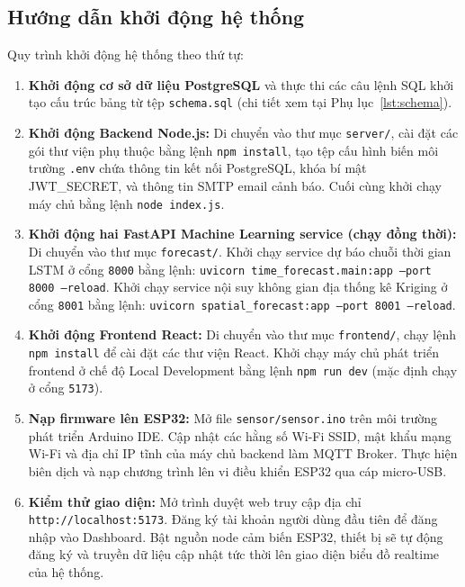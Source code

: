 \subsection{Hướng dẫn khởi động hệ thống}
\label{subsec:design:deploy:guide}

Quy trình khởi động hệ thống theo thứ tự:

\begin{enumerate}[leftmargin=2cm]
  \item \textbf{Khởi động cơ sở dữ liệu PostgreSQL} và thực thi các câu lệnh SQL khởi tạo cấu trúc bảng từ tệp \texttt{schema.sql} (chi tiết xem tại Phụ lục~\ref{lst:schema}).
  \item \textbf{Khởi động Backend Node.js:}
    Di chuyển vào thư mục \texttt{server/}, cài đặt các gói thư viện phụ thuộc bằng lệnh \texttt{npm install}, tạo tệp cấu hình biến môi trường \texttt{.env} chứa thông tin kết nối PostgreSQL, khóa bí mật JWT\_SECRET, và thông tin SMTP email cảnh báo. Cuối cùng khởi chạy máy chủ bằng lệnh \texttt{node index.js}.
  \item \textbf{Khởi động hai FastAPI Machine Learning service (chạy đồng thời):}
    Di chuyển vào thư mục \texttt{forecast/}. Khởi chạy service dự báo chuỗi thời gian LSTM ở cổng \texttt{8000} bằng lệnh:
    \texttt{uvicorn time\_forecast.main:app --port 8000 --reload}.
    Khởi chạy service nội suy không gian địa thống kê Kriging ở cổng \texttt{8001} bằng lệnh:
    \texttt{uvicorn spatial\_forecast:app --port 8001 --reload}.
  \item \textbf{Khởi động Frontend React:}
    Di chuyển vào thư mục \texttt{frontend/}, chạy lệnh \texttt{npm install} để cài đặt các thư viện React. Khởi chạy máy chủ phát triển frontend ở chế độ Local Development bằng lệnh \texttt{npm run dev} (mặc định chạy ở cổng \texttt{5173}).
  \item \textbf{Nạp firmware lên ESP32:}
    Mở file \texttt{sensor/sensor.ino} trên môi trường phát triển Arduino IDE. Cập nhật các hằng số Wi-Fi SSID, mật khẩu mạng Wi-Fi và địa chỉ IP tĩnh của máy chủ backend làm MQTT Broker. Thực hiện biên dịch và nạp chương trình lên vi điều khiển ESP32 qua cáp micro-USB.
  \item \textbf{Kiểm thử giao diện:}
    Mở trình duyệt web truy cập địa chỉ \texttt{http://localhost:5173}. Đăng ký tài khoản người dùng đầu tiên để đăng nhập vào Dashboard. Bật nguồn node cảm biến ESP32, thiết bị sẽ tự động đăng ký và truyền dữ liệu cập nhật tức thời lên giao diện biểu đồ realtime của hệ thống.
\end{enumerate}

